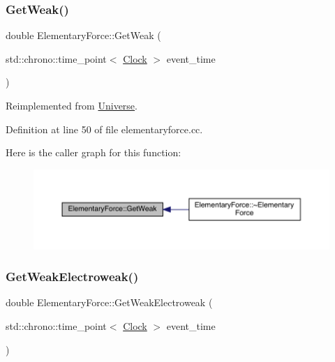 \subsubsection{\texorpdfstring{Get\+Weak()}{GetWeak()}}
{\footnotesize\ttfamily double Elementary\+Force\+::\+Get\+Weak (\begin{DoxyParamCaption}\item[{std\+::chrono\+::time\+\_\+point$<$ \hyperlink{universe_8h_a0ef8d951d1ca5ab3cfaf7ab4c7a6fd80}{Clock} $>$}]{event\+\_\+time }\end{DoxyParamCaption})\hspace{0.3cm}{\ttfamily [virtual]}}



Reimplemented from \hyperlink{class_universe_a4476b7e0a3fc1764909f556257fd9ec7}{Universe}.



Definition at line 50 of file elementaryforce.\+cc.

Here is the caller graph for this function\+:
\nopagebreak
\begin{figure}[H]
\begin{center}
\leavevmode
\includegraphics[width=350pt]{class_elementary_force_a4669f2ce414e508c70ae4ce0df503ad1_icgraph}
\end{center}
\end{figure}
\mbox{\label{class_elementary_force_a928e06a1fa81b8d7ec4a426d959a0f98}} 
\subsubsection{\texorpdfstring{Get\+Weak\+Electroweak()}{GetWeakElectroweak()}}
{\footnotesize\ttfamily double Elementary\+Force\+::\+Get\+Weak\+Electroweak (\begin{DoxyParamCaption}\item[{std\+::chrono\+::time\+\_\+point$<$ \hyperlink{universe_8h_a0ef8d951d1ca5ab3cfaf7ab4c7a6fd80}{Clock} $>$}]{event\+\_\+time }\end{DoxyParamCaption})\hspace{0.3cm}{\ttfamily [virtual]}}



